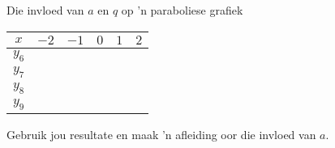 \begin{Investigation}{Die invloed van $a$ en $q$ op 'n paraboliese grafiek}
\begin{table}[H]
  \begin{center}
    \begin{tabular}{|c|c|c|c|c|c|}\hline
      $x$&$-2$&$-1$&$0$&$1$&$2$\\ \hline
      $y_6$ & \hspace{1cm} & \hspace{1cm} & \hspace{1cm} & \hspace{1cm} & \hspace{1cm} \\ \hline
      $y_7$&&&&&\\ \hline
      $y_8$&&&&&\\ \hline
      $y_9$&&&&&\\ \hline
    \end{tabular}
  \end{center}
\end{table}
Gebruik jou resultate en maak 'n afleiding oor die invloed van $a$.
\end{Investigation}

